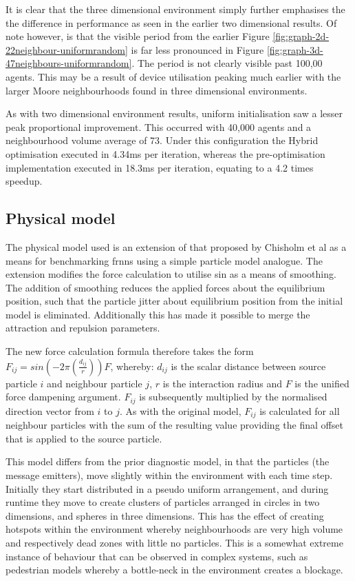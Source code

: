       It is clear that the three dimensional environment simply further emphasises the the difference in performance as seen in the earlier two dimensional results. Of note however, is that the visible period from the earlier Figure \ref{fig:graph-2d-22neighbour-uniformrandom} is far less pronounced in Figure \ref{fig:graph-3d-47neighbours-uniformrandom}. The period is  not clearly visible past 100,00 agents. This may be a result of device utilisation peaking much earlier with the larger Moore neighbourhoods found in three dimensional environments.

      As with two dimensional environment results, uniform initialisation saw a lesser peak proportional improvement. This occurred with 40,000 agents and a neighbourhood volume average of 73. Under this configuration the Hybrid optimisation executed in 4.34ms per iteration, whereas the pre-optimisation implementation executed in 18.3ms per iteration, equating to a 4.2 times speedup.
      
  \subsection{Physical model}
    The physical model used is an extension of that proposed by Chisholm et al as a means for benchmarking \gls{frnns} using a simple particle model analogue.\cite{CRM16} The extension modifies the force calculation to utilise sin as a means of smoothing. The addition of smoothing reduces the applied forces about the equilibrium position, such that the particle jitter about equilibrium position from the initial model is eliminated. Additionally this has made it possible to merge the attraction and repulsion parameters.
    
    The new force calculation formula therefore takes the form $F_{ij} = sin(-2\pi(\frac{d_{ij}}{r}))F$, whereby: $d_{ij}$ is the scalar distance between source particle $i$ and neighbour particle $j$, $r$ is the interaction radius and $F$ is the unified force dampening argument. $F_{ij}$ is subsequently multiplied by the normalised direction vector from $i$ to $j$. As with the original model, $F_{ij}$ is calculated for all neighbour particles with the sum of the resulting value providing the final offset that is applied to the source particle.
    
    This model differs from the prior diagnostic model, in that the particles (the message emitters), move slightly within the environment with each time step. Initially they start distributed in a pseudo uniform arrangement, and during runtime they move to create clusters of particles arranged in circles in two dimensions, and spheres in three dimensions. This has the effect of creating hotspots within the environment whereby neighbourhoods are very high volume and respectively dead zones with little no particles. This is a somewhat extreme instance of behaviour that can be observed in complex systems, such as pedestrian models whereby a bottle-neck in the environment creates a blockage.
    
